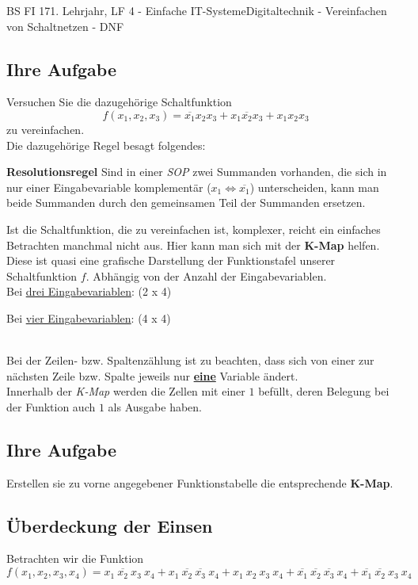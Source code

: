\documentclass[11pt,twocolumn,oneside,openany,headings=optiontotoc,11pt,numbers=noenddot]{article}
\begin{document}
\begin{worksheet}{BS FI 17}{1. Lehrjahr, LF 4 - Einfache IT-Systeme}{Digitaltechnik - Vereinfachen von Schaltnetzen - DNF}
		\subsection*{Ihre Aufgabe} Versuchen Sie die dazugehörige Schaltfunktion \[f(x_1,x_2,x_3) = \overline{x_1}x_2x_3 + x_1\overline{x_2}x_3 + x_1x_2x_3\] zu vereinfachen.\\
		Die dazugehörige Regel besagt folgendes:
		\begin{framed} \textbf{Resolutionsregel} Sind in einer \textit{SOP} zwei Summanden vorhanden, die sich in nur einer Eingabevariable komplementär (\(x_1 \Leftrightarrow \overline{x_1}\)) unterscheiden, kann man beide Summanden durch den gemeinsamen Teil der Summanden ersetzen.\end{framed}
		Ist die Schaltfunktion, die zu vereinfachen ist, komplexer, reicht ein einfaches Betrachten manchmal nicht aus. Hier kann man sich mit der \textbf{K-Map} helfen. Diese ist quasi eine grafische Darstellung der Funktionstafel unserer Schaltfunktion \(f\). Abhängig von der Anzahl der Eingabevariablen.\\
		Bei \underline{drei Eingabevariablen}: (2 x 4)\\
		\par\noindent
		\begin{karnaugh-map}[4][2][1][$x_2x_3$][$x_1$]
			
		\end{karnaugh-map}
		\par\noindent
		Bei \underline{vier Eingabevariablen}: (4 x 4)\\
		\par\noindent
		\begin{karnaugh-map}[4][4][1][$x_3x_4$][$x_1x_2$]
			
		\end{karnaugh-map}\\
		Bei der Zeilen- bzw. Spaltenzählung ist zu beachten, dass sich von einer zur nächsten Zeile bzw. Spalte jeweils nur \underline{\textbf{eine}} Variable ändert.\\
		Innerhalb der \textit{K-Map} werden die Zellen mit einer \(1\) befüllt, deren Belegung bei der Funktion auch \(1\) als Ausgabe haben.
		\subsection*{Ihre Aufgabe}	Erstellen sie zu vorne angegebener Funktionstabelle die entsprechende \textbf{K-Map}.
		\subsection{Überdeckung der Einsen} Betrachten wir die Funktion\\
		\(f(x_1,x_2,x_3,x_4) = x_1\ \overline{x_2}\ x_3\ x_4 + x_1\ \overline{x_2}\ \overline{x_3}\ x_4 + x_1\ x_2\ x_3\ x_4 + \overline{x_1}\ \overline{x_2}\ \overline{x_3}\ x_4 + \overline{x_1}\ \overline{x_2}\ x_3\ x_4\)

\end{worksheet}
\end{document}
